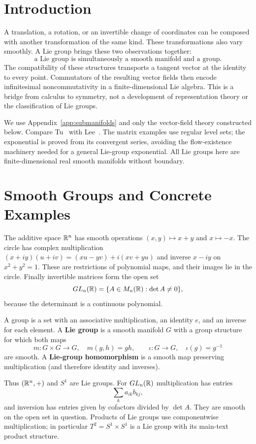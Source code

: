 \label{app:lie}
\section*{Introduction}
A translation, a rotation, or an invertible change of coordinates can be
composed with another transformation of the same kind. These transformations
also vary smoothly. A Lie group brings these two observations together:
\[
\boxed{\text{a Lie group is simultaneously a smooth manifold and a group}.}
\]
The compatibility of these structures transports a tangent vector at the
identity to every point. Commutators of the resulting vector fields then
encode infinitesimal noncommutativity in a finite-dimensional Lie algebra.
This is a bridge from calculus to symmetry, not a development of
representation theory or the classification of Lie groups.

We use Appendix~\ref{app:submanifolds} and only the vector-field theory
constructed below. Compare Tu~\cite[\S\S14--16]{tu-manifolds} with
Lee~\cite[Chapters 7--8,20]{lee-smooth}. The matrix examples use regular
level sets; the exponential is proved from its convergent series, avoiding
the flow-existence machinery needed for a general Lie-group exponential.
All Lie groups here are finite-dimensional real smooth manifolds without boundary.

\section{Smooth Groups and Concrete Examples}
The additive space $\mathbb{R}^n$ has smooth operations $(x,y)\mapsto x+y$ and
$x\mapsto-x$. The circle has complex multiplication
$(x+iy)(u+iv)=(xu-yv)+i(xv+yu)$ and inverse $x-iy$ on $x^2+y^2=1$.
These are restrictions of polynomial maps, and their images lie in the
circle. Finally invertible matrices form the open set
\[
GL_n(\mathbb{R})=\{A\in M_n(\mathbb{R}):\det A\ne0\},
\]
because the determinant is a continuous polynomial.

\begin{definition}
A group is a set with an associative multiplication, an identity $e$, and
an inverse for each element. A \textbf{Lie group} is a smooth manifold $G$
with a group structure for which both maps
\[
m:G\times G\to G,\quad m(g,h)=gh,\qquad
\iota:G\to G,\quad\iota(g)=g^{-1}
\]
are smooth. A \textbf{Lie-group homomorphism} is a smooth map preserving
multiplication (and therefore identity and inverses).
\end{definition}
Thus $(\mathbb{R}^n,+)$ and $S^1$ are Lie groups. For $GL_n(\mathbb{R})$ multiplication
has entries
\[
\sum_k a_{ik}b_{kj},
\]
 and inversion has entries given by
cofactors divided by $\det A$. They are smooth on the open set in question.
Products of Lie groups use componentwise multiplication; in particular
$T^2=S^1\times S^1$ is a Lie group with its main-text product structure.

